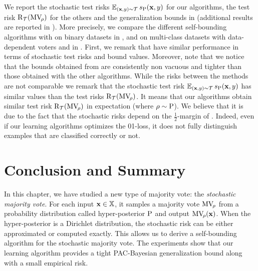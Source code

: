 We report the stochastic test risks $\operatorname*{\mathbb{E}}_{(\mathbf{x},y)\sim\mathcal{T}}s_{\mathrm{P}}(\mathbf{x}, y)$ for our algorithms, the test risk $\text{R}_{\mathcal{T}}(\text{MV}_{\!\rho})$ for the others and the generalization bounds in  (additional results are reported in ).
More precisely, we compare the different self-bounding algorithms with  on binary datasets in , and on multi-class datasets with data-dependent voters and  in .
First, we remark that  have similar performance in terms of stochastic test risks and bound values. 
Moreover, note that we notice that the bounds obtained from  are consistently non vacuous and tighter than those obtained with the other algorithms.
While the risks between the methods are not comparable we remark that the stochastic test risk $\operatorname*{\mathbb{E}}_{(\mathbf{x},y)\sim\mathcal{T}}s_{\mathrm{P}}(\mathbf{x}, y)$ has similar values than the test risks $\text{R}_{\mathcal{T}}(\text{MV}_{\!\rho})$.
It means that our algorithms obtain similar test risk $\text{R}_{\mathcal{T}}(\text{MV}_{\!\rho})$ in expectation (where $\rho\sim\mathrm{P}$).
We believe that it is due to the fact that the stochastic risks depend on the $\frac{1}{2}$-margin of \citet{LavioletteMorvantRalaivolaRoy2017}.
Indeed, even if our learning algorithms optimizes the 01-loss, it does not fully distinguish examples that are classified correctly or not.

\section{Conclusion and Summary}

In this chapter, we have studied a new type of majority vote: the {\it stochastic majority vote}.
For each input $\mathbf{x}\in\mathbb{X}$, it samples a majority vote $\text{MV}_{\!\rho}$ from a probability distribution called hyper-posterior $\mathrm{P}$ and output $\text{MV}_{\!\rho}(\mathbf{x})$.
When the hyper-posterior is a Dirichlet distribution, the stochastic risk can be either approximated or computed exactly.
This allows us to derive a self-bounding algorithm for the stochastic majority vote.
The experiments show that our learning algorithm provides a tight PAC-Bayesian generalization bound along with a small empirical risk.\\

